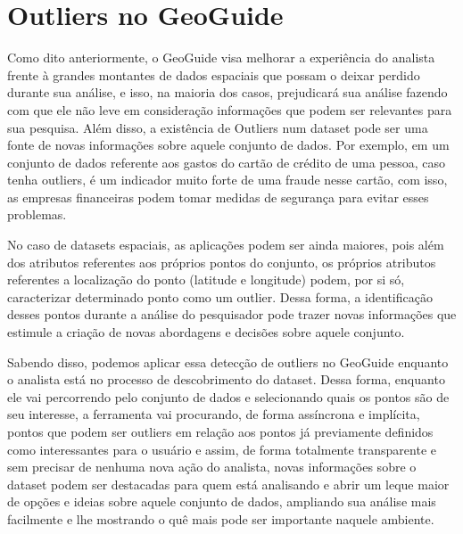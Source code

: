 \section{Outliers no GeoGuide}

Como dito anteriormente, o GeoGuide visa melhorar a experiência do analista frente à grandes montantes de dados espaciais que possam o deixar perdido durante sua análise, e isso, na maioria dos casos, prejudicará sua análise fazendo com que ele não leve em consideração informações que podem ser relevantes para sua pesquisa. Além disso, a existência de Outliers num dataset pode ser uma fonte de novas informações sobre aquele conjunto de dados. Por exemplo, em um conjunto de dados referente aos gastos do cartão de crédito de uma pessoa, caso tenha outliers, é um indicador muito forte de uma fraude nesse cartão, com isso, as empresas financeiras podem tomar medidas de segurança para evitar esses problemas.

No caso de datasets espaciais, as aplicações podem ser ainda maiores, pois além dos atributos referentes aos próprios pontos do conjunto, os próprios atributos referentes a localização do ponto (latitude e longitude) podem, por si só, caracterizar determinado ponto como um outlier. Dessa forma, a identificação desses pontos durante a análise do pesquisador pode trazer novas informações que estimule a criação de novas abordagens e decisões sobre aquele conjunto.

Sabendo disso, podemos aplicar essa detecção de outliers no GeoGuide enquanto o analista está no processo de descobrimento do dataset. Dessa forma, enquanto ele vai percorrendo pelo conjunto de dados e selecionando quais os pontos são de seu interesse, a ferramenta vai procurando, de forma assíncrona e implícita, pontos que podem ser outliers em relação aos pontos já previamente definidos como interessantes para o usuário e assim, de forma totalmente transparente e sem precisar de nenhuma nova ação do analista, novas informações sobre o dataset podem ser destacadas para quem está analisando e abrir um leque maior de opções e ideias sobre aquele conjunto de dados, ampliando sua análise mais facilmente e lhe mostrando o quê mais pode ser importante naquele ambiente.

